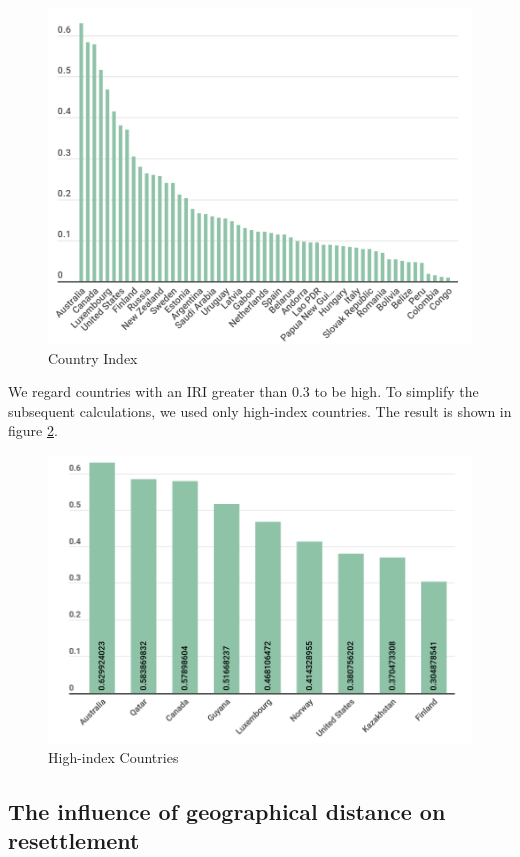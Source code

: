 \documentclass[12pt]{article}  %
\begin{document}
\begin{figure}[htbp]
	\centering
	\includegraphics[width=.8\textwidth]{IRI.png}
	\caption{ Country Index}\label{country_index}
\end{figure}

\newpage



We regard countries with an IRI greater than 0.3 to be high. To simplify the subsequent calculations, we used only high-index countries. The result is shown in figure \ref{high_index_countries}.



\begin{figure}[htbp]
	\centering
	\includegraphics[width=.8\textwidth]{high_index_countries.png}
	\caption{High-index Countries}\label{high_index_countries}
\end{figure}





\subsection{The influence of geographical distance on resettlement}
\end{document}
